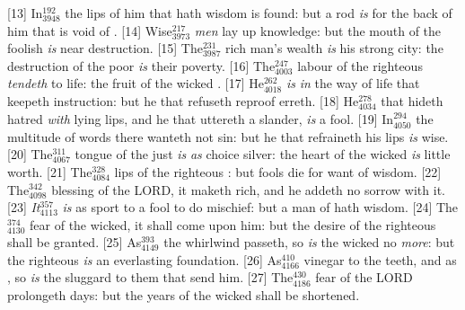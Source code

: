[13] \textcolor[cmyk]{0.99998,1,0,0}{In\textcolor{jungle}{$_{3948}^{192}$} the lips of him that hath  wisdom is found: but a rod \emph{is} for the back of him that is void of .}
[14] \textcolor[cmyk]{0.99998,1,0,0}{Wise\textcolor{jungle}{$_{3973}^{217}$} \emph{men} lay up knowledge: but the mouth of the foolish \emph{is} near destruction.}
[15] \textcolor[cmyk]{0.99998,1,0,0}{The\textcolor{jungle}{$_{3987}^{231}$} rich man's wealth \emph{is} his strong city: the destruction of the poor \emph{is} their poverty.}
[16] \textcolor[cmyk]{0.99998,1,0,0}{The\textcolor{jungle}{$_{4003}^{247}$} labour of the righteous \emph{tendeth} to life: the fruit of the wicked .}
[17] \textcolor[cmyk]{0.99998,1,0,0}{He\textcolor{jungle}{$_{4018}^{262}$} \emph{is} \emph{in} the way of life that keepeth instruction: but he that refuseth reproof erreth.}
[18] \textcolor[cmyk]{0.99998,1,0,0}{He\textcolor{jungle}{$_{4034}^{278}$} that hideth hatred \emph{with} lying lips, and he that uttereth a slander, \emph{is} a fool.}
[19] \textcolor[cmyk]{0.99998,1,0,0}{In\textcolor{jungle}{$_{4050}^{294}$} the multitude of words there wanteth not sin: but he that refraineth his lips \emph{is} wise.}
[20] \textcolor[cmyk]{0.99998,1,0,0}{The\textcolor{jungle}{$_{4067}^{311}$} tongue of the just \emph{is} \emph{as} choice silver: the heart of the wicked \emph{is} little worth.}
[21] \textcolor[cmyk]{0.99998,1,0,0}{The\textcolor{jungle}{$_{4084}^{328}$} lips of the righteous : but fools die for want of wisdom.}
[22] \textcolor[cmyk]{0.99998,1,0,0}{The\textcolor{jungle}{$_{4098}^{342}$} blessing of the LORD, it maketh rich, and he addeth no sorrow with it.}
[23] \textcolor[cmyk]{0.99998,1,0,0}{\emph{It}\textcolor{jungle}{$_{4113}^{357}$} \emph{is} as sport to a fool to do mischief: but a man of  hath wisdom.}
[24] \textcolor[cmyk]{0.99998,1,0,0}{The\textcolor{jungle}{$_{4130}^{374}$} fear of the wicked, it shall come upon him: but the desire of the righteous shall be granted.}
[25] \textcolor[cmyk]{0.99998,1,0,0}{As\textcolor{jungle}{$_{4149}^{393}$} the whirlwind passeth, so \emph{is} the wicked no \emph{more}: but the righteous \emph{is} an everlasting foundation.}
[26] \textcolor[cmyk]{0.99998,1,0,0}{As\textcolor{jungle}{$_{4166}^{410}$} vinegar to the teeth, and as , so \emph{is} the sluggard to them that send him.}
[27] \textcolor[cmyk]{0.99998,1,0,0}{The\textcolor{jungle}{$_{4186}^{430}$} fear of the LORD prolongeth days: but the years of the wicked shall be shortened.}
